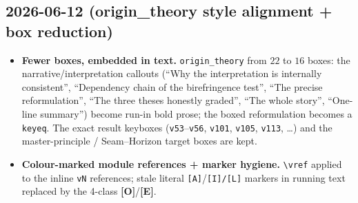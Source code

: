 \documentclass[11pt]{article}
\providecommand{\mE}{\textbf{[E]}}\providecommand{\mC}{\textbf{[C]}}
\providecommand{\mO}{\textbf{[O]}}\providecommand{\mX}{\textbf{[X]}}
\providecommand{\vref}[1]{\texttt{#1}}
\begin{document}
\subsection*{2026-06-12 (origin\_theory style alignment + box reduction)}
\begin{itemize}
\item \textbf{Fewer boxes, embedded in text.} \texttt{origin\_theory} from $22$ to $16$ boxes: the
  narrative/interpretation callouts (``Why the interpretation is internally consistent'', ``Dependency
  chain of the birefringence test'', ``The precise reformulation'', ``The three theses honestly graded'',
  ``The whole story'', ``One-line summary'') become run-in bold prose; the boxed reformulation becomes a
  \texttt{keyeq}. The exact result keyboxes (\vref{v53}--\vref{v56}, \vref{v101}, \vref{v105},
  \vref{v113}, \ldots) and the master-principle / Seam--Horizon target boxes are kept.
\item \textbf{Colour-marked module references + marker hygiene.} \texttt{\textbackslash vref} applied to
  the inline \texttt{vN} references; stale literal \texttt{[A]}/\texttt{[I]/[L]} markers in running text
  replaced by the 4-class \mO/\mE.
\end{itemize}
\end{document}
